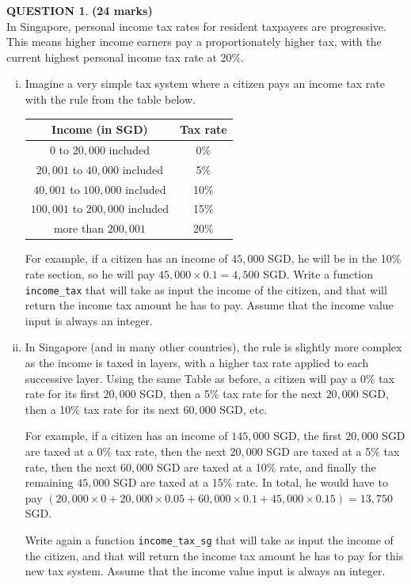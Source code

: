 \documentclass[a4paper,12pt]{article}
\theoremstyle{definition}
\newtheorem{ques}[dummy]{QUESTION}
\theoremstyle{plain}
\newcommand{\ttx}[1]{\texttt{#1}}
\begin{document}
\begin{ques}\hfill \textbf{(24 marks)}\vspace*{2em}\\
	In Singapore, personal income tax rates for resident taxpayers are progressive. This means higher income earners pay a proportionately higher tax, with the current highest personal income tax rate at 20\%.
	
	\begin{enumerate}[(i)]
		\item Imagine a very simple tax system where a citizen pays an income tax rate with the rule from the table below.
		\begin{table}[H]
			\centering
			\begin{tabular}{|c|c|}
				\hline
				\textbf{Income} (in SGD) & \textbf{Tax rate}\\
				\hline
				$0$ to $20,000$ included & 0\%\\
				$20,001$ to $40,000$ included & 5\%\\
				$40,001$ to $100,000$ included & 10\%\\
				$100,001$ to $200,000$ included & 15\%\\
				more than $200,001$ & 20\%\\
				\hline
			\end{tabular}
		\end{table}
		For example, if a citizen has an income of $45,000$ SGD, he will be in the 10\% rate section, so he will pay $45,000\times 0.1 = 4,500$ SGD. Write a function \ttx{income\_tax} that will take as input the income of the citizen, and that will return the income tax amount he has to pay. Assume that the income value input is always an integer.
		
		
		\item In Singapore (and in many other countries), the rule is slightly more complex as the income is taxed in layers, with a higher tax rate applied to each successive layer. Using the same Table as before, a citizen will pay a 0\% tax rate for its first $20,000$ SGD, then a 5\% tax rate for the next $20,000$ SGD, then a 10\% tax rate for its next $60,000$ SGD, etc.
		
		For example, if a citizen has an income of $145,000$ SGD, the first $20,000$ SGD are taxed at a 0\% tax rate, then the next $20,000$ SGD are taxed at a 5\% tax rate, then the next $60,000$ SGD are taxed at a 10\% rate, and finally the remaining $45,000$ SGD are taxed at a 15\% rate. In total, he would have to pay $(20,000\times 0 + 20,000\times 0.05 + 60,000 \times 0.1 + 45,000\times 0.15) = 13,750$ SGD.
		
		Write again a function \ttx{income\_tax\_sg} that will take as input the income of the citizen, and that will return the income tax amount he has to pay for this new tax system. Assume that the income value input is always an integer.
	\end{enumerate}
\end{ques}
\end{document}
